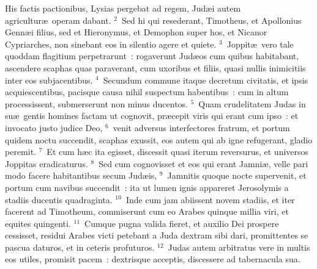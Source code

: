 \bchapter
\lettrine[lines=3,image=true,loversize=0.05,lraise=-0.03]{H}{}is factis pactionibus, Lysias pergebat ad regem, Jud\ae i autem agricultur\ae\ operam dabant.
${}^{2}$~Sed hi qui resederant, Timotheus, et Apollonius Genn\ae i filius, sed et Hieronymus, et Demophon super hos, et Nicanor Cypriarches, non sinebant eos in silentio agere et quiete.
${}^{3}$~Joppit\ae\ vero tale quoddam flagitium perpetrarunt~: rogaverunt Jud\ae os cum quibus habitabant, ascendere scaphas quas paraverant, cum uxoribus et filiis, quasi nullis inimicitiis inter eos subjacentibus.
${}^{4}$~Secundum commune itaque decretum civitatis, et ipsis acquiescentibus, pacisque causa nihil suspectum habentibus~: cum in altum processissent, submerserunt non minus ducentos.
${}^{5}$~Quam crudelitatem Judas in su\ae\ gentis homines factam ut cognovit, pr\ae cepit viris qui erant cum ipso~: et invocato justo judice Deo,
${}^{6}$~venit adversus interfectores fratrum, et portum quidem noctu succendit, scaphas exussit, eos autem qui ab igne refugerant, gladio peremit.
${}^{7}$~Et cum h\ae c ita egisset, discessit quasi iterum reversurus, et universos Joppitas eradicaturus.
${}^{8}$~Sed cum cognovisset et eos qui erant Jamni\ae , velle pari modo facere habitantibus secum Jud\ae is,
${}^{9}$~Jamnitis quoque nocte supervenit, et portum cum navibus succendit~: ita ut lumen ignis appareret Jerosolymis a stadiis ducentis quadraginta.
${}^{10}$~Inde cum jam abiissent novem stadiis, et iter facerent ad Timotheum, commiserunt cum eo Arabes quinque millia viri, et equites quingenti.
${}^{11}$~Cumque pugna valida fieret, et auxilio Dei prospere cessisset, residui Arabes victi petebant a Juda dextram sibi dari, promittentes se pascua daturos, et in ceteris profuturos.
${}^{12}$~Judas autem arbitratus vere in multis eos utiles, promisit pacem~: dextrisque acceptis, discessere ad tabernacula sua.


